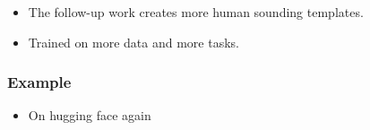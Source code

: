 \documentclass[11pt]{article}
\begin{document}
\begin{minipage}[l]{.5\linewidth}
    \begin{figure}[H]
        \centering
    \end{figure}    
\end{minipage}\hfill
\begin{minipage}[r]{.48\linewidth}
    \begin{itemize}
        \item The follow-up work creates more human sounding templates.
    \end{itemize}
\end{minipage}

\begin{minipage}[l]{.5\linewidth}
    \begin{figure}[H]
        \centering
    \end{figure}    
\end{minipage}\hfill
\begin{minipage}[r]{.48\linewidth}
    \begin{itemize}
        \item Trained on more data and more tasks. 
    \end{itemize}
\end{minipage}

\subsubsection{Example}

\begin{minipage}[l]{.5\linewidth}
    \begin{figure}[H]
        \centering
    \end{figure}    
\end{minipage}\hfill
\begin{minipage}[r]{.48\linewidth}
    \begin{itemize}
        \item On hugging face again
    \end{itemize}
\end{minipage}
\end{document}
